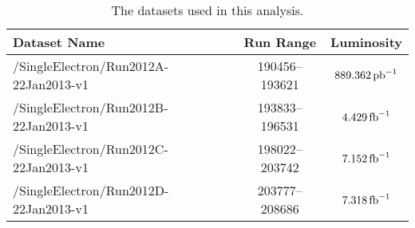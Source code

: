 \begin{table}[h]
\centering
\begin{center}
    \begin{tabular}{ | l | c | c |}
    \hline
	Dataset Name                          & Run Range      & Luminosity       \\ \hline
	/SingleElectron/Run2012A-22Jan2013-v1 & 190456--193621 & $889.362 \mbox{\ensuremath{\,\text{pb}^\text{$-$1}}}$ \\ \hline
	/SingleElectron/Run2012B-22Jan2013-v1 & 193833--196531 & $4.429 \mbox{\ensuremath{\,\text{fb}^\text{$-$1}}}$   \\ \hline
	/SingleElectron/Run2012C-22Jan2013-v1 & 198022--203742 & $7.152 \mbox{\ensuremath{\,\text{fb}^\text{$-$1}}}$   \\ \hline
	/SingleElectron/Run2012D-22Jan2013-v1 & 203777--208686 & $7.318 \mbox{\ensuremath{\,\text{fb}^\text{$-$1}}}$   \\ \hline
    \end{tabular}
\end{center}
\caption{
    The datasets used in this analysis.
}
\label{table:datasets}
\end{table}
